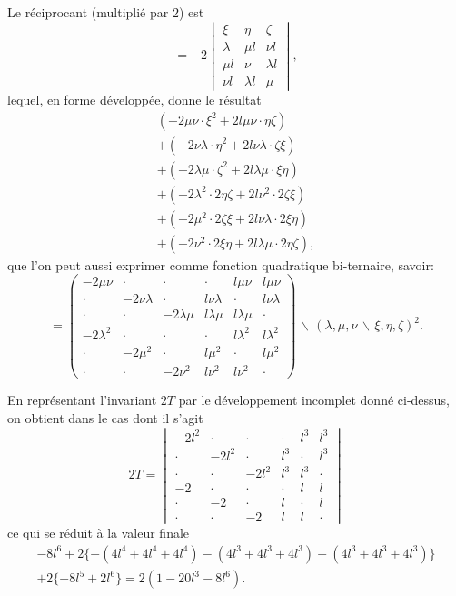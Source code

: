 \documentclass[11pt,a4paper]{article}
\theoremstyle{definition}
\begin{document}
\newpage

Le r\'{e}ciprocant (multipli\'{e} par $2$) est
\[=-2\begin{vmatrix}\xi & \eta & \zeta \\ \lambda & \mu l & \nu l \\ \mu l & \nu & \lambda l \\ \nu l & \lambda l & \mu\end{vmatrix},\]
lequel, en forme d\'{e}velopp\'{e}e, donne le r\'{e}sultat
\begin{multline*}
(-2\mu\nu \cdot \xi^{2} + 2l\mu\nu \cdot \eta\zeta) \\
+ (-2\nu\lambda \cdot \eta^{2} + 2l\nu\lambda \cdot \zeta\xi) \\
+ (-2\lambda\mu \cdot \zeta^{2} + 2l\lambda\mu \cdot \xi\eta) \\
+ (-2\lambda^{2} \cdot 2\eta\zeta + 2l\nu^{2} \cdot 2\zeta\xi) \\
+ (-2\mu^{2} \cdot 2\zeta\xi + 2l\nu\lambda \cdot 2\xi\eta) \\
+ (-2\nu^{2} \cdot 2\xi\eta + 2l\lambda\mu \cdot 2\eta\zeta),
\end{multline*}
que l'on peut aussi exprimer comme fonction quadratique bi-ternaire, savoir:
\[
= \begin{pmatrix}
-2\mu\nu & \cdot & \cdot & \cdot & l\mu\nu & l\mu\nu \\
\cdot & -2\nu\lambda & \cdot & l\nu\lambda & \cdot & l\nu\lambda \\
\cdot & \cdot & -2\lambda\mu & l\lambda\mu & l\lambda\mu & \cdot \\
-2\lambda^{2} & \cdot & \cdot & \cdot & l\lambda^{2} & l\lambda^{2} \\
\cdot & -2\mu^{2} & \cdot & l\mu^{2} & \cdot & l\mu^{2} \\
\cdot & \cdot & -2\nu^{2} & l\nu^{2} & l\nu^{2} & \cdot
\end{pmatrix}\!\!\,\backslash\!\!\,(\lambda,\mu,\nu\,\backslash\!\!\,\xi,\eta,\zeta)^{2}.
\]

En repr\'{e}sentant l'invariant $2T$ par le d\'{e}veloppement incomplet donn\'{e} ci-dessus,
on obtient dans le cas dont il s'agit
\[
2T = \begin{vmatrix}
-2l^{2} & \cdot & \cdot & \cdot & l^{3} & l^{3} \\
\cdot & -2l^{2} & \cdot & l^{3} & \cdot & l^{3} \\
\cdot & \cdot & -2l^{2} & l^{3} & l^{3} & \cdot \\
-2 & \cdot & \cdot & \cdot & l & l \\
\cdot & -2 & \cdot & l & \cdot & l \\
\cdot & \cdot & -2 & l & l & \cdot
\end{vmatrix}
\]
ce qui se r\'{e}duit \`{a} la valeur finale
\begin{multline*}
-8l^{6} + 2\{-(4l^{4}+4l^{4}+4l^{4})-(4l^{3}+4l^{3}+4l^{3})
-(4l^{3}+4l^{3}+4l^{3})\} \\
+ 2\{-8l^{5}+2l^{6}\} = 2(1 - 20l^{3} - 8l^{6}).
\end{multline*}
\end{document}
